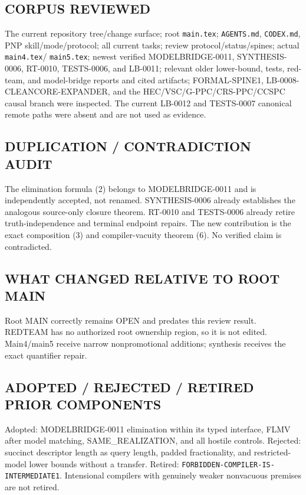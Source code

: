 \documentclass[11pt]{article}
\begin{document}
\subsection*{CORPUS REVIEWED}
The current repository tree/change surface; root \texttt{main.tex};
\texttt{AGENTS.md}, \texttt{CODEX.md}, PNP skill/mode/protocol; all current
tasks; review protocol/status/spines; actual \texttt{main4.tex}/
\texttt{main5.tex}; newest verified MODELBRIDGE-0011, SYNTHESIS-0006,
RT-0010, TESTS-0006, and LB-0011; relevant older lower-bound, tests, red-team,
and model-bridge reports and cited artifacts; FORMAL-SPINE1,
LB-0008-CLEANCORE-EXPANDER, and the HEC/VSC/G-PPC/CRS-PPC/CCSPC causal branch
were inspected.  The current LB-0012 and TESTS-0007 canonical remote paths
were absent and are not used as evidence.

\subsection*{DUPLICATION / CONTRADICTION AUDIT}
The elimination formula (2) belongs to MODELBRIDGE-0011 and is independently
accepted, not renamed.  SYNTHESIS-0006 already establishes the analogous
source-only closure theorem.  RT-0010 and TESTS-0006 already retire
truth-independence and terminal endpoint repairs.  The new contribution is
the exact composition (3) and compiler-vacuity theorem (6).  No verified
claim is contradicted.

\subsection*{WHAT CHANGED RELATIVE TO ROOT MAIN}
Root MAIN correctly remains OPEN and predates this review result.  REDTEAM
has no authorized root ownership region, so it is not edited.  Main4/main5
receive narrow nonpromotional additions; synthesis receives the exact
quantifier repair.

\subsection*{ADOPTED / REJECTED / RETIRED PRIOR COMPONENTS}
Adopted: MODELBRIDGE-0011 elimination within its typed interface, FLMV after
model matching, SAME\_REALIZATION, and all hostile controls.  Rejected:
succinct descriptor length as query length, padded fractionality, and
restricted-model lower bounds without a transfer.  Retired:
\texttt{FORBIDDEN-COMPILER-IS-INTERMEDIATE1}.  Intensional compilers with
genuinely weaker nonvacuous premises are not retired.
\end{document}
